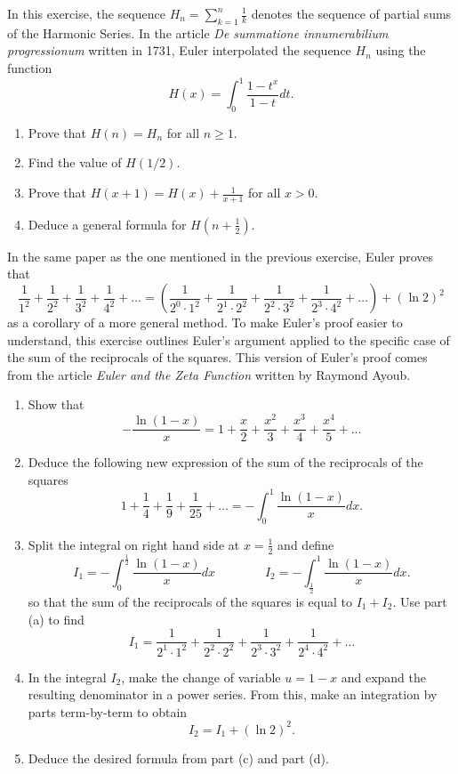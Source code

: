 \begin{exercise}
    In this exercise, the sequence $H_n = \sum_{k=1}^{n}\frac{1}{k}$ denotes the sequence of partial sums of the Harmonic Series. In the article \textit{De summatione innumerabilium progressionum} written in 1731, Euler interpolated the sequence $H_n$ using the function
    $$H(x) = \int_{0}^{1}\frac{1-t^x}{1-t}dt.$$
    \begin{enumerate}[label=(\alph*)]
        \item Prove that $H(n) = H_n$ for all $n \geq 1$.
        \item Find the value of $H(1/2)$.
        \item Prove that $H(x + 1) = H(x) + \frac{1}{x+1}$ for all $x > 0$.
        \item Deduce a general formula for $H(n + \frac{1}{2})$. 
    \end{enumerate}
\end{exercise}

\begin{exercise}
    In the same paper as the one mentioned in the previous exercise, Euler proves that 
    $$\frac{1}{1^2} + \frac{1}{2^2} + \frac{1}{3^2} + \frac{1}{4^2} + \dots = \left(\frac{1}{2^0\cdot 1^2} + \frac{1}{2^1\cdot 2^2} + \frac{1}{2^2\cdot 3^2} + \frac{1}{2^3\cdot 4^2} + \dots \right) + (\ln 2)^2$$
    as a corollary of a more general method. To make Euler's proof easier to understand, this exercise outlines Euler's argument applied to the specific case of the sum of the reciprocals of the squares. This version of Euler's proof comes from the article \textit{Euler and the Zeta Function} written by Raymond Ayoub.
    \begin{enumerate}[label=(\alph*)]
        \item Show that
        $$-\frac{\ln(1-x)}{x} = 1 + \frac{x}{2} + \frac{x^2}{3} + \frac{x^3}{4} + \frac{x^4}{5} + \dots$$
        \item Deduce the following new expression of the sum of the reciprocals of the squares
        $$1 + \frac{1}{4} + \frac{1}{9} + \frac{1}{25} + \dots = -\int_{0}^{1}\frac{\ln(1-x)}{x}dx.$$
        \item Split the integral on right hand side at $x= \frac{1}{2}$ and define
        $$I_1 = -\int_{0}^{\frac{1}{2}}\frac{\ln(1-x)}{x}dx \qquad \qquad I_2 = -\int_{\frac{1}{2}}^{1}\frac{\ln(1-x)}{x}dx.$$
        so that the sum of the reciprocals of the squares is equal to $I_1 + I_2$. Use part (a) to find
        $$I_1 = \frac{1}{2^1\cdot 1^2} + \frac{1}{2^2\cdot 2^2} + \frac{1}{2^3\cdot 3^2} + \frac{1}{2^4\cdot 4^2} + \dots$$
        \item In the integral $I_2$, make the change of variable $u = 1-x$ and expand the resulting denominator in a power series. From this, make an integration by parts term-by-term to obtain
        $$I_2 = I_1 + (\ln 2)^2.$$
        \item Deduce the desired formula from part (c) and part (d).
    \end{enumerate}
\end{exercise}

